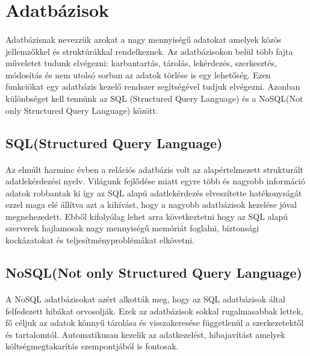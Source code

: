 \section{Adatbázisok}
\paragraph{}
Adatbázisnak nevezzük azokat a nagy mennyiségű adatokat amelyek közös jellemzőkkel és struktúrákkal rendelkeznek. Az adatbázisokon belül több fajta műveletet tudunk elvégezni: karbantartás, tárolás, lekérdezés, szerkesztés, módosítás és nem utolsó sorban az adatok törlése is egy lehetőség. Ezen funkciókat egy adatbázis kezelő rendszer segítségével tudjuk elvégezni.\cite{dbms} Azonban különbséget kell tennünk az SQL (Structured Query Language) és a NoSQL(Not only Structured Query Language) között.
\subsection{SQL(Structured Query Language)}
\paragraph{}
Az elmúlt harminc évben a relációs adatbázis volt az alapértelmezett strukturált adatlekérdezési nyelv. Világunk fejlődése miatt egyre több és nagyobb információ adatok robbantak ki így az SQL alapú adatlekérdezés elveszítette hatékonyságát ezzel maga elé állítva azt a kihívást, hogy a nagyobb adatbázisok kezelése jóval megnehezedett. Ebből kifolyólag lehet arra következtetni hogy az SQL alapú szerverek hajlamosak nagy mennyiségű memóriát foglalni, biztonsági kockázatokat és teljesítményproblémákat elkövetni.\cite{venkatraman2016sql} 
	
\subsection{NoSQL(Not only Structured Query Language)}
\paragraph{}
A NoSQL adatbázisokat azért alkották meg, hogy az SQL adatbázisok által felfedezett hibákat orvosolják. Ezek az adatbázisok sokkal rugalmasabbak lettek, fő céljuk az adatok könnyű tárolása és visszakeresése függetlenül a szerkezetektől és tartalomtól. Automatikusan kezelik az adatkezelést, hibajavítást amelyek költségmegtakarítás szempontjából is fontosak.\cite{venkatraman2016sql} 
	
